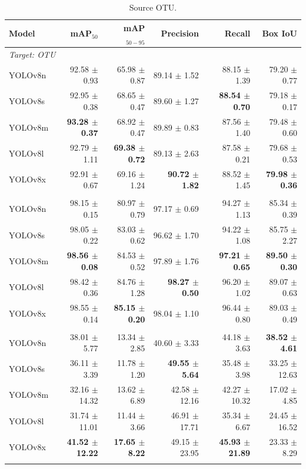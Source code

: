 \documentclass[10pt]{article}
\begin{document}
\begin{table}[t]
\centering
\small
\caption{Source OTU.}
\label{tab:yolo_src_otu}
\begin{tabular}{lrrrrr}
\toprule
Model & mAP$_{50}$ & mAP$_{50-95}$ & Precision & Recall & Box IoU \\
\midrule
\multicolumn{6}{l}{\textit{Target: OTU}} \\
YOLOv8n & 92.58 $\pm$ 0.93 & 65.98 $\pm$ 0.87 & 89.14 $\pm$ 1.52 & 88.15 $\pm$ 1.39 & 79.20 $\pm$ 0.77 \\
YOLOv8s & 92.95 $\pm$ 0.38 & 68.65 $\pm$ 0.47 & 89.60 $\pm$ 1.27 & \textbf{88.54 $\pm$ 0.70} & 79.18 $\pm$ 0.17 \\
YOLOv8m & \textbf{93.28 $\pm$ 0.37} & 68.92 $\pm$ 0.47 & 89.89 $\pm$ 0.83 & 87.56 $\pm$ 1.40 & 79.48 $\pm$ 0.60 \\
YOLOv8l & 92.79 $\pm$ 1.11 & \textbf{69.38 $\pm$ 0.72} & 89.13 $\pm$ 2.63 & 87.58 $\pm$ 0.21 & 79.68 $\pm$ 0.53 \\
YOLOv8x & 92.91 $\pm$ 0.67 & 69.16 $\pm$ 1.24 & \textbf{90.72 $\pm$ 1.82} & 88.52 $\pm$ 1.45 & \textbf{79.98 $\pm$ 0.36} \\
\addlinespace[2pt]
\multicolumn{6}{l}{\textit{Target: OVATUS}} \\
YOLOv8n & 98.15 $\pm$ 0.15 & 80.97 $\pm$ 0.79 & 97.17 $\pm$ 0.69 & 94.27 $\pm$ 1.13 & 85.34 $\pm$ 0.39 \\
YOLOv8s & 98.05 $\pm$ 0.22 & 83.03 $\pm$ 0.62 & 96.62 $\pm$ 1.70 & 94.22 $\pm$ 1.08 & 85.75 $\pm$ 2.27 \\
YOLOv8m & \textbf{98.56 $\pm$ 0.08} & 84.53 $\pm$ 0.52 & 97.89 $\pm$ 1.76 & \textbf{97.21 $\pm$ 0.65} & \textbf{89.50 $\pm$ 0.30} \\
YOLOv8l & 98.42 $\pm$ 0.36 & 84.76 $\pm$ 1.28 & \textbf{98.27 $\pm$ 0.50} & 96.20 $\pm$ 1.02 & 89.07 $\pm$ 0.63 \\
YOLOv8x & 98.55 $\pm$ 0.14 & \textbf{85.15 $\pm$ 0.20} & 98.04 $\pm$ 1.10 & 96.44 $\pm$ 0.80 & 89.03 $\pm$ 0.49 \\
\addlinespace[2pt]
\multicolumn{6}{l}{\textit{Target: USOVA}} \\
YOLOv8n & 38.01 $\pm$ 5.77 & 13.34 $\pm$ 2.85 & 40.60 $\pm$ 3.33 & 44.18 $\pm$ 3.63 & \textbf{38.52 $\pm$ 4.61} \\
YOLOv8s & 36.11 $\pm$ 3.39 & 11.78 $\pm$ 1.20 & \textbf{49.55 $\pm$ 5.64} & 35.48 $\pm$ 3.98 & 33.25 $\pm$ 12.63 \\
YOLOv8m & 32.16 $\pm$ 14.32 & 13.62 $\pm$ 6.89 & 42.58 $\pm$ 12.16 & 42.27 $\pm$ 10.32 & 17.02 $\pm$ 4.85 \\
YOLOv8l & 31.74 $\pm$ 11.01 & 11.44 $\pm$ 3.66 & 46.91 $\pm$ 17.71 & 35.34 $\pm$ 6.67 & 24.45 $\pm$ 16.52 \\
YOLOv8x & \textbf{41.52 $\pm$ 12.22} & \textbf{17.65 $\pm$ 8.22} & 49.15 $\pm$ 23.95 & \textbf{45.93 $\pm$ 21.89} & 23.33 $\pm$ 8.29 \\
\addlinespace[2pt]
\bottomrule
\end{tabular}
\end{table}
\end{document}
